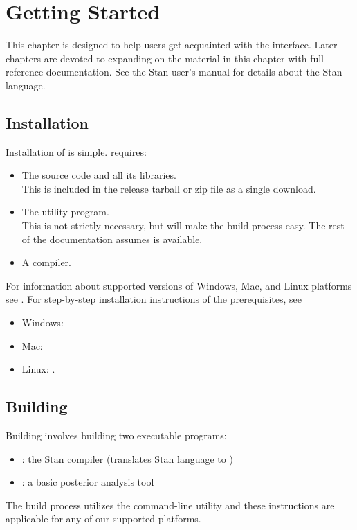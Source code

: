 \chapter{Getting Started}

\noindent
This chapter is designed to help users get acquainted with the
\CmdStan interface. Later chapters are devoted to expanding on the
material in this chapter with full reference documentation. See the
Stan user's manual for details about the Stan language.

\section{Installation}

Installation of \CmdStan is simple. \CmdStan requires:
\begin{itemize}
\item The \CmdStan source code and all its libraries. \\
  This is included in the release tarball or zip file as a single
  download.
\item The  utility program. \\
  This is not strictly necessary, but will make the build process
  easy. The rest of the documentation assumes  is available.
\item A \Cpp compiler.
\end{itemize}

\noindent For information about supported versions of Windows, Mac, and Linux
platforms see . For step-by-step installation
instructions of the prerequisites, see
\begin{itemize}
  \item Windows: 
  \item Mac: 
  \item Linux: .
\end{itemize}


\section{Building \CmdStan}

Building \CmdStan involves building two executable programs:
%
\begin{itemize}
\item {}: the Stan compiler (translates Stan language to \Cpp)
\item {}: a basic posterior analysis tool
\end{itemize}
%
The build process utilizes the  command-line
utility and these instructions are applicable for any of our supported
platforms.

